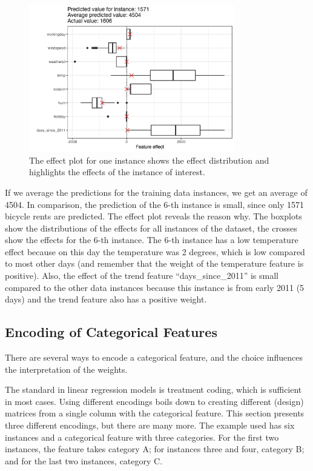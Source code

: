 \documentclass[
  10pt,
]{scrbook}
\begin{document}
\begin{figure}

{\centering \includegraphics[width=0.8\textwidth]{images/linear-effects-single-1} 

}

\caption{The effect plot for one instance shows the effect distribution and highlights the effects of the instance of interest.}\label{fig:linear-effects-single}
\end{figure}

If we average the predictions for the training data instances, we get an average of 4504.
In comparison, the prediction of the 6-th instance is small, since only 1571 bicycle rents are predicted.
The effect plot reveals the reason why.
The boxplots show the distributions of the effects for all instances of the dataset, the crosses show the effects for the 6-th instance.
The 6-th instance has a low temperature effect because on this day the temperature was 2 degrees, which is low compared to most other days (and remember that the weight of the temperature feature is positive).
Also, the effect of the trend feature ``days\_since\_2011'' is small compared to the other data instances because this instance is from early 2011 (5 days) and the trend feature also has a positive weight.

\hypertarget{cat-code}{%
\subsection{Encoding of Categorical Features}\label{cat-code}}

There are several ways to encode a categorical feature, and the choice influences the interpretation of the weights.

The standard in linear regression models is treatment coding, which is sufficient in most cases.
Using different encodings boils down to creating different (design) matrices from a single column with the categorical feature.
This section presents three different encodings, but there are many more.
The example used has six instances and a categorical feature with three categories.
For the first two instances, the feature takes category A;
for instances three and four, category B;
and for the last two instances, category C.
\end{document}
